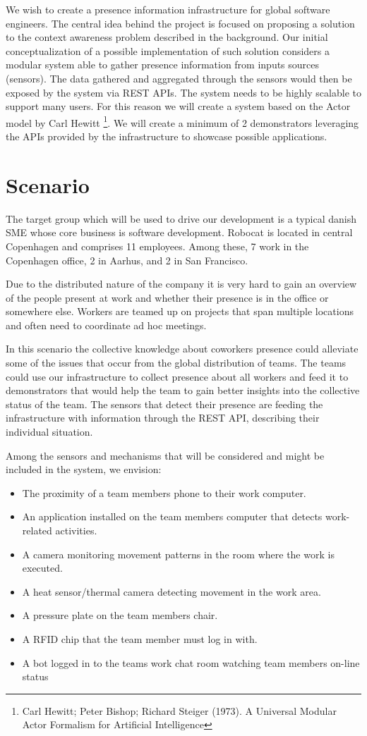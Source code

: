 \documentclass{sigchi}
\begin{document}
We wish to create a presence information infrastructure for global software engineers. The central idea behind the project is focused on proposing a solution to the context awareness problem described in the background. Our initial conceptualization of a possible implementation of such solution considers a modular system able to gather presence information from inputs sources (sensors).
The data gathered and aggregated through the sensors would then be exposed by the system via REST APIs.
The system needs to be highly scalable to support many users.
For this reason we will create a system based on the Actor model by Carl Hewitt \footnote{Carl Hewitt; Peter Bishop; Richard Steiger (1973). A Universal Modular Actor Formalism for Artificial Intelligence}.
We will create a minimum of 2 demonstrators leveraging the APIs provided by the infrastructure to showcase possible applications.

\section{Scenario}
The target group which will be used to drive our development is a typical danish SME whose core business is software development.
Robocat is located in central Copenhagen and comprises 11 employees.
Among these, 7 work in the Copenhagen office, 2 in Aarhus, and 2 in San Francisco.

Due to the distributed nature of the company it is very hard to gain an overview of the people present at work and whether their presence is in the office or somewhere else. Workers are teamed up on projects that span multiple locations and often need to coordinate ad hoc meetings.

In this scenario the collective knowledge about coworkers presence could alleviate some of the issues that occur from the global distribution of teams. The teams could use our infrastructure to collect presence about all workers and feed it to demonstrators that would help the team to gain better insights into the collective status of the team. The sensors that detect their presence are feeding the infrastructure with information through the REST API, describing their individual situation.

Among the sensors and mechanisms that will be considered and might be included in the system, we envision:
\begin{itemize}
\item The proximity of a team members phone to their work computer.
\item An application installed on the team members computer that detects work-related activities.
\item A camera monitoring movement patterns in the room where the work is executed.
\item A heat sensor/thermal camera detecting movement in the work area.
\item A pressure plate on the team members chair.
\item A RFID chip that the team member must log in with.
\item A bot logged in to the teams work chat room watching team members on-line status
\end{itemize}
\end{document}
